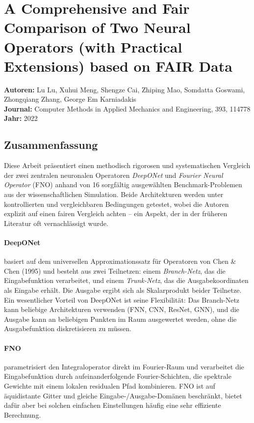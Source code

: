 \documentclass[a4paper,12pt]{article}
\begin{document}
\section*{A Comprehensive and Fair Comparison of Two Neural Operators
(with Practical Extensions) based on FAIR Data}

\noindent\textbf{Autoren:} Lu Lu, Xuhui Meng, Shengze Cai, Zhiping Mao,
Somdatta Goswami, Zhongqiang Zhang, George Em Karniadakis \\
\textbf{Journal:} Computer Methods in Applied Mechanics and Engineering,
393, 114778 \\
\textbf{Jahr:} 2022

\subsection*{Zusammenfassung}

Diese Arbeit pr\"asentiert einen methodisch rigorosen und systematischen
Vergleich der zwei zentralen neuronalen Operatoren \emph{DeepONet} und
\emph{Fourier Neural Operator} (FNO) anhand von 16 sorgf\"altig
ausgew\"ahlten Benchmark-Problemen aus der wissenschaftlichen Simulation.
Beide Architekturen werden unter kontrollierten und vergleichbaren
Bedingungen getestet, wobei die Autoren explizit auf einen fairen Vergleich
achten -- ein Aspekt, der in der fr\"uheren Literatur oft vernachl\"assigt
wurde.

\paragraph{DeepONet} basiert auf dem universellen Approximationssatz f\"ur
Operatoren von Chen \& Chen (1995) und besteht aus zwei Teilnetzen: einem
\emph{Branch-Netz}, das die Eingabefunktion verarbeitet, und einem
\emph{Trunk-Netz}, das die Ausgabekoordinaten als Eingabe erh\"alt. Die
Ausgabe ergibt sich als Skalarprodukt beider Teilnetze. Ein wesentlicher
Vorteil von DeepONet ist seine Flexibilit\"at: Das Branch-Netz kann
beliebige Architekturen verwenden (FNN, CNN, ResNet, GNN), und die
Ausgabe kann an beliebigen Punkten im Raum ausgewertet werden, ohne die
Ausgabefunktion diskretisieren zu m\"ussen.

\paragraph{FNO} parametrisiert den Integraloperator direkt im
Fourier-Raum und verarbeitet die Eingabefunktion durch aufeinanderfolgende
Fourier-Schichten, die spektrale Gewichte mit einem lokalen residualen
Pfad kombinieren. FNO ist auf \"aquidistante Gitter und gleiche
Eingabe-/Ausgabe-Dom\"anen beschr\"ankt, bietet daf\"ur aber bei solchen
einfachen Einstellungen h\"aufig eine sehr effiziente Berechnung.
\end{document}
